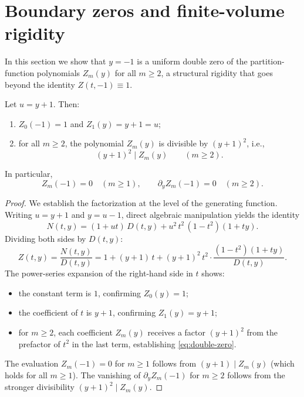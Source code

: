 \section{Boundary zeros and finite-volume rigidity}\label{sec:boundary-zeros}

In this section we show that $y = -1$ is a uniform double zero of the partition-function polynomials $Z_m(y)$ for all $m \ge 2$, a structural rigidity that goes beyond the identity $Z(t,-1) \equiv 1$.

\begin{proposition}[Uniform double-zero boundary at $y = -1$]\label{prop:double-zero}
Let $u = y + 1$.
Then:
\begin{enumerate}
\item $Z_0(-1) = 1$ and $Z_1(y) = y + 1 = u$;
\item for all $m \ge 2$, the polynomial $Z_m(y)$ is divisible by $(y+1)^2$, i.e.,
\begin{equation}\label{eq:double-zero}
(y+1)^2 \mid Z_m(y) \qquad (m \ge 2).
\end{equation}
\end{enumerate}
In particular,
\[
Z_m(-1) = 0 \quad (m \ge 1), \qquad
\partial_y Z_m(-1) = 0 \quad (m \ge 2).
\]
\end{proposition}

\begin{proof}
We establish the factorization at the level of the generating function.
Writing $u = y + 1$ and $y = u - 1$, direct algebraic manipulation yields the identity
\begin{equation}\label{eq:N-D-identity}
N(t,y) = (1 + ut)\,D(t,y) + u^2\,t^2\,(1 - t^2)(1 + ty).
\end{equation}
Dividing both sides by $D(t,y)$:
\begin{equation}\label{eq:Z-factored}
Z(t,y) = \frac{N(t,y)}{D(t,y)}
= 1 + (y+1)\,t + (y+1)^2\,t^2 \cdot \frac{(1 - t^2)(1 + ty)}{D(t,y)}.
\end{equation}
The power-series expansion of the right-hand side in $t$ shows:
\begin{itemize}
\item the constant term is $1$, confirming $Z_0(y) = 1$;
\item the coefficient of $t$ is $y + 1$, confirming $Z_1(y) = y + 1$;
\item for $m \ge 2$, each coefficient $Z_m(y)$ receives a factor $(y+1)^2$ from the prefactor of $t^2$ in the last term, establishing \eqref{eq:double-zero}.
\end{itemize}
The evaluation $Z_m(-1) = 0$ for $m \ge 1$ follows from $(y+1) \mid Z_m(y)$ (which holds for all $m \ge 1$).
The vanishing of $\partial_y Z_m(-1)$ for $m \ge 2$ follows from the stronger divisibility $(y+1)^2 \mid Z_m(y)$.
\end{proof}

